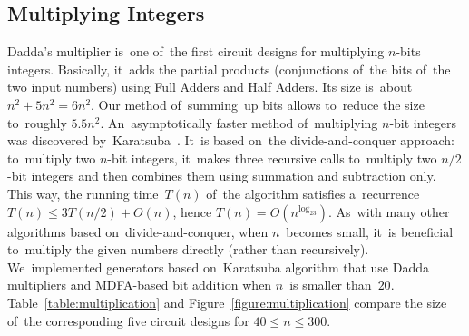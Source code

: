 \documentclass[a4paper, UKenglish, cleveref, autoref,  thm-restate, anonymous]{lipics-v2021}
\begin{document}
    \subsection{Multiplying Integers}

    Dadda's multiplier is~one of~the first circuit designs for multiplying $n$-bits integers. Basically, it~adds the partial products (conjunctions of~the bits of~the
    two input numbers) using Full Adders and Half Adders. Its size is~about $n^2+5n^2=6n^2$. Our method of~summing~up bits allows to~reduce the size
    to~roughly $5.5n^2$. An~asymptotically faster method of~multiplying
    $n$-bit integers was discovered by~Karatsuba~\cite{karatsuba}. It~is based
    on~the divide-and-conquer approach: to~multiply two $n$-bit integers,
    it~makes three recursive calls to~multiply two $n/2$-bit integers and
    then combines them using summation and subtraction only. This way, the running
    time~$T(n)$ of~the algorithm satisfies a~recurrence $T(n) \le 3T(n/2)+O(n)$,
    hence $T(n)=O(n^{\log_23})$. As~with many other algorithms based on~divide-and-conquer, when $n$~becomes small, it~is beneficial to~multiply
    the given numbers directly (rather than recursively).
    We~implemented generators based on~Karatsuba algorithm that
    use Dadda multipliers and MDFA-based bit addition when $n$~is smaller than~$20$.
    Table~\ref{table:multiplication} and Figure~\ref{figure:multiplication}
    compare the size of~the corresponding five circuit designs for $40 \le n \le 300$.
\end{document}
